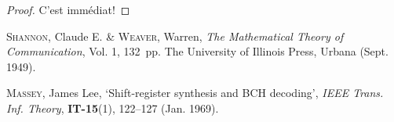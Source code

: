 \documentclass[a4paper,twoside,10pt,english,french]{article}   %
\theoremstyle{definition}
\theoremstyle{remark}
\theoremstyle{plain}
\begin{document}
\begin{proof}
  C'est immédiat!
\end{proof}

%
\clearpage
\fancyhead[RO,LE]{}
\setlength{\parskip}{0pt}
\listoffigures
{}
\listoftables
{}
\lstlistoflistings
%
\begin{thebibliography}{99}

  \textsc{Shannon}, Claude E. \& \textsc{Weaver}, Warren,
  \emph{The Mathematical Theory of Communication},
  Vol\@. 1,
  132~pp.
  The University of Illinois Press, Urbana
  (Sept\@. 1949).

    \textsc{Massey}, James Lee,
    \enquote*{Shift-register synthesis and BCH decoding},
    \emph{IEEE Trans\@. Inf\@. Theory},
    \textbf{IT-15}(1),
    122--127
    (Jan\@. 1969).

\end{thebibliography}
%
\tableofcontents
\clearpage
\listoftodos
%
\end{document}
